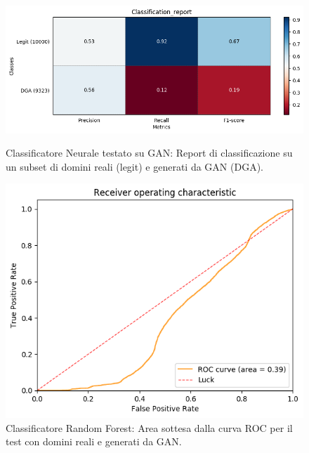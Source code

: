 \begin{figure}[p]
    \centering
    \includegraphics[width=\columnwidth]{figures/gan/class_rep.png}
    \caption{Classificatore Neurale testato su GAN: Report di classificazione su un subset di domini reali (legit) e generati da GAN (DGA).\label{fig:repgan}}

    \centering
    \includegraphics[width=\columnwidth]{figures/gan/roc_plot.png}
    \caption{Classificatore Random Forest: Area sottesa dalla curva ROC per il test con domini reali e generati da GAN.\label{fig:rocgan}}
\end{figure}
